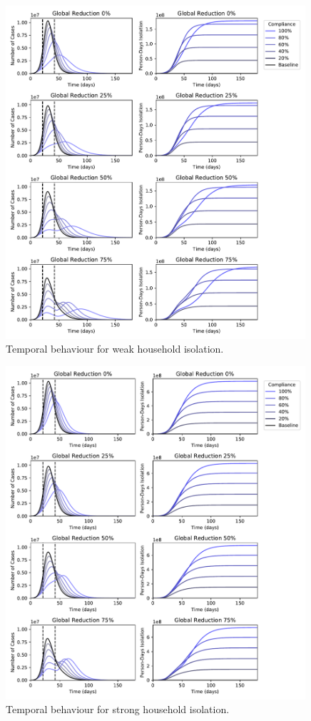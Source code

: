 \documentclass[10pt,a4paper]{article}
\begin{document}
\begin{figure}[H]
\begin{center}
\includegraphics[width=0.99\textwidth]{time_series_weak.pdf}
\end{center}
\caption{Temporal behaviour for weak household isolation.}
\end{figure}

\clearpage


\begin{figure}[H]
\begin{center}
\includegraphics[width=0.99\textwidth]{time_series_strong.pdf}
\end{center}
\caption{Temporal behaviour for strong household isolation.}
\end{figure}
\end{document}
